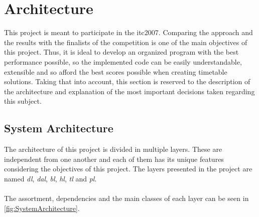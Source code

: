 \chapter{Architecture}
\label{Architecture}
\thispagestyle{plain}

This project is meant to participate in the \gls{itc2007}. Comparing the approach and the results with the finalists of the competition is one of the main objectives of this project. Thus, it is ideal to develop an organized program with the best performance possible, so the implemented code can be easily understandable, extensible and so afford the best scores possible when creating timetable solutions. Taking that into account, this section is reserved to the description of the architecture and explanation of the most important decisions taken regarding this subject.

\section{System Architecture}

The architecture of this project is divided in multiple layers. These are independent from one another and each of them has its unique features considering the objectives of this project. The layers presented in the project are named \textit{\gls{dl}}, \textit{\gls{dal}}, \textit{\gls{bl}}, \textit{\gls{hl}}, \textit{\gls{tl}} and \textit{\gls{pl}}. \\
\\
The assortment, dependencies and the main classes of each layer can be seen in \ref{fig:SystemArchitecture}.

